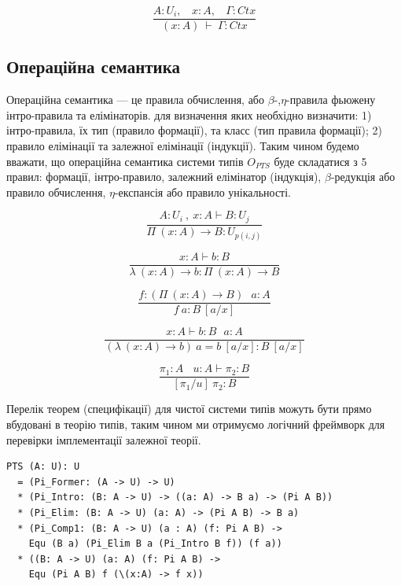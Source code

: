 \begin{equation}
\tag{Ctx-intro$_2$}
\dfrac
{A : U_i,\ \ \ \ x : A,\ \ \ \ \Gamma : Ctx}
{(x : A)\ \vdash\ \Gamma : Ctx}
\end{equation}

\subsection{Операційна семантика}

Операційна семантика --- це правила обчислення,
або $\beta$-,$\eta$-правила фьюжену інтро-правила та елімінаторів.
для визначення яких необхідно визначити:
1) інтро-правила, їх тип (правило формації), та класс (тип правила формації);
2) правило елімінації та залежної елімінації (індукції).
Таким чином будемо вважати, що операційна семантика системи типів $O_{PTS}$
буде складатися з 5 правил: формації, інтро-правило,
залежний елімінатор (індукція), $\beta$-редукція або правило обчислення,
$\eta$-експансія або правило унікальності.

\begin{equation}
\tag{$\Pi$-formation}
\dfrac
{A:U_i\ ,\ x:A \vdash B : U_j}
{\Pi\ (x:A) \rightarrow B : U_{p(i,j)}}
\end{equation}

\begin{equation}
\tag{$\lambda$-intro}
\dfrac
{x:A \vdash b : B}
{\lambda\ (x:A) \rightarrow b : \Pi\ (x: A) \rightarrow B }
\end{equation}

\begin{equation}
\tag{$App$-elimination}
\dfrac
{f: (\Pi\ (x:A) \rightarrow B)\ \ \ a: A}
{f\ a : B\ [a/x]}
\end{equation}

\begin{equation}
\tag{$\beta$-computation}
\dfrac
{x:A \vdash b: B\ \ \ a:A}
{(\lambda\ (x:A) \rightarrow b)\ a = b\ [a/x] : B\ [a/x]}
\end{equation}

\begin{equation}
\tag{subst}
\dfrac
{\pi_1 : A\ \ \ \ u:A \vdash \pi_2 : B}
{[\pi_1/u]\ \pi_2 : B}
\end{equation}

Перелік теорем (специфікації) для чистої системи типів можуть бути
прямо вбудовані в теорію типів, таким чином ми отримуємо логічний фреймворк
для перевірки імплементації залежної теорії.

\begin{lstlisting}[mathescape=true]
PTS (A: U): U
  = (Pi_Former: (A -> U) -> U)
  * (Pi_Intro: (B: A -> U) -> ((a: A) -> B a) -> (Pi A B))
  * (Pi_Elim: (B: A -> U) (a: A) -> (Pi A B) -> B a)
  * (Pi_Comp1: (B: A -> U) (a : A) (f: Pi A B) ->
    Equ (B a) (Pi_Elim B a (Pi_Intro B f)) (f a))
  * ((B: A -> U) (a: A) (f: Pi A B) ->
    Equ (Pi A B) f (\(x:A) -> f x))
\end{lstlisting}

